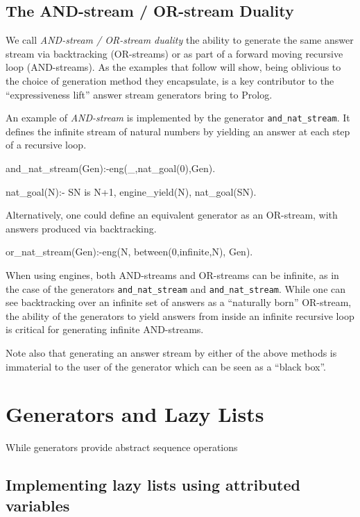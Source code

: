 \documentclass{new_tlp}
\begin{document}
\subsection{The AND-stream / OR-stream Duality}

We call {\em AND-stream / OR-stream duality} the
ability to generate the same answer stream via backtracking (OR-streams) or
as part of a forward moving recursive loop (AND-streams).
As the examples that follow will show,
being oblivious to the choice of generation method they encapsulate,
is a key contributor to the ``expressiveness lift'' answer stream
generators bring to Prolog.

An example of {\em AND-stream} is  implemented
by the generator {\tt and\_nat\_stream}. 
It defines the infinite stream of natural numbers 
by yielding an answer at each step of a recursive loop.
\begin{code}
and_nat_stream(Gen):-eng(_,nat_goal(0),Gen).

nat_goal(N):-
  SN is N+1,
  engine_yield(N),
  nat_goal(SN).
\end{code}

Alternatively, one could define 
an equivalent generator as an OR-stream,  with answers 
produced via  backtracking.
\begin{code}
or_nat_stream(Gen):-eng(N, between(0,infinite,N), Gen).
\end{code}

When using engines, 
both AND-streams and OR-streams can be infinite, as in the
case of the generators {\tt and\_nat\_stream} and {\tt and\_nat\_stream}.
While one can see backtracking over an infinite set of answers as
a ``naturally born'' OR-stream, the ability of the generators to
yield answers from inside an infinite recursive loop is critical
for generating infinite AND-streams.

Note also that generating an answer stream by either of the above methods
is immaterial to the user of the generator which can be seen as a ``black box''.


\section{Generators and Lazy Lists}

While generators provide abstract sequence operations

\subsection{Implementing lazy lists using attributed variables}
\end{document}
